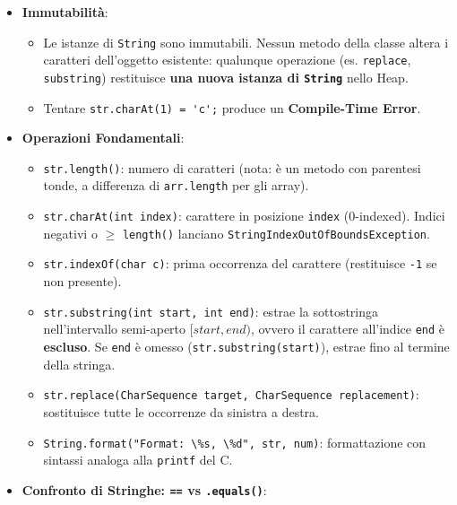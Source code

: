 \documentclass[11pt,a4paper]{article}
\newcommand{\passthrough}[1]{#1}
\providecommand{\tightlist}{\setlength{\itemsep}{0pt}\setlength{\parskip}{0pt}}
\begin{document}
\begin{itemize}
\tightlist
\item
  \textbf{Immutabilità}:

  \begin{itemize}
  \tightlist
  \item
    Le istanze di \passthrough{\lstinline!String!} sono immutabili.
    Nessun metodo della classe altera i caratteri dell'oggetto
    esistente: qualunque operazione (es.
    \passthrough{\lstinline!replace!},
    \passthrough{\lstinline!substring!}) restituisce \textbf{una nuova
    istanza di \passthrough{\lstinline!String!}} nello Heap.
  \item
    Tentare \passthrough{\lstinline!str.charAt(1) = 'c';!} produce un
    \textbf{Compile-Time Error}.
  \end{itemize}
\item
  \textbf{Operazioni Fondamentali}:

  \begin{itemize}
  \tightlist
  \item
    \passthrough{\lstinline!str.length()!}: numero di caratteri (nota: è
    un metodo con parentesi tonde, a differenza di
    \passthrough{\lstinline!arr.length!} per gli array).
  \item
    \passthrough{\lstinline!str.charAt(int index)!}: carattere in
    posizione \passthrough{\lstinline!index!} (0-indexed). Indici
    negativi o \(\ge\) \passthrough{\lstinline!length()!} lanciano
    \passthrough{\lstinline!StringIndexOutOfBoundsException!}.
  \item
    \passthrough{\lstinline!str.indexOf(char c)!}: prima occorrenza del
    carattere (restituisce \passthrough{\lstinline!-1!} se non
    presente).
  \item
    \passthrough{\lstinline!str.substring(int start, int end)!}: estrae
    la sottostringa nell'intervallo semi-aperto \([start, end)\), ovvero
    il carattere all'indice \passthrough{\lstinline!end!} è
    \textbf{escluso}. Se \passthrough{\lstinline!end!} è omesso
    (\passthrough{\lstinline!str.substring(start)!}), estrae fino al
    termine della stringa.
  \item
    \passthrough{\lstinline!str.replace(CharSequence target, CharSequence replacement)!}:
    sostituisce tutte le occorrenze da sinistra a destra.
  \item
    \passthrough{\lstinline!String.format("Format: \%s, \%d", str, num)!}:
    formattazione con sintassi analoga alla
    \passthrough{\lstinline!printf!} del C.
  \end{itemize}
\item
  \textbf{Confronto di Stringhe: \passthrough{\lstinline!==!} vs
  \passthrough{\lstinline!.equals()!}}:


\end{itemize}
\end{document}
